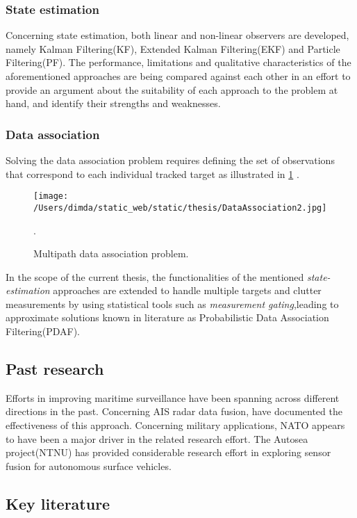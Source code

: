 \subsubsection{State estimation}
Concerning state estimation, both linear and non-linear observers are developed, namely Kalman Filtering(KF), Extended Kalman Filtering(EKF) and Particle Filtering(PF). The performance, limitations and qualitative characteristics of the aforementioned approaches are being compared against each other in an effort to provide an argument about the suitability of each approach to the problem at hand, and identify their strengths and weaknesses.
\subsubsection{Data association}
Solving the data association problem requires defining the set of observations that correspond to each individual tracked target as illustrated in \cref{fig:MultipathDA} .


\begin{figure}[H]
	\centering
	\texttt{[image: /Users/dimda/static\_web/static/thesis/DataAssociation2.jpg]}
	\caption{ Multipath data association problem\cite{Lan2019}.}.
	\label{fig:MultipathDA}
\end{figure}

In the scope of the current thesis, the functionalities of the mentioned \emph{state-estimation} approaches are extended to handle multiple targets and clutter measurements by using statistical tools such as \emph{measurement gating},leading to approximate solutions known in literature as Probabilistic Data Association Filtering(PDAF). 

\subsection{Past research}
Efforts in improving maritime surveillance have been spanning across different directions in the past. Concerning  AIS radar data fusion, \cite{Habtemariam2015} \cite{Heymann2015} have documented the effectiveness of this approach. Concerning military applications, NATO appears to have been a major driver in the related research effort\cite{Guerriero2008,9781586035365}. The Autosea project(NTNU) \cite{Brekke2019}has provided considerable research effort in exploring sensor fusion for autonomous surface vehicles.
\subsection{Key literature}


